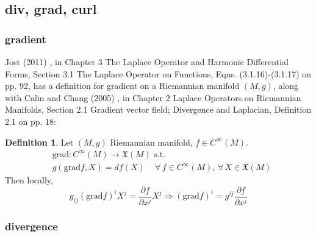 \documentclass[twoside,landscape,10pt]{amsart}
\theoremstyle{plain}
\theoremstyle{definition}
\newtheorem{definition}{Definition}
\theoremstyle{remark}
\theoremstyle{remark}
\begin{document}
\begin{multicols*}{2}

\part{div, grad, curl}

\section{gradient}

Jost (2011) \cite{JJost2011}, in Chapter 3 The Laplace Operator and Harmonic Differential Forms, Section 3.1 The Laplace Operator on Functions, Eqns. (3.1.16)-(3.1.17) on pp. 92, has a definition for gradient on a Riemannian manifold $(M,g)$, along with Calin and Chang (2005) \cite{OCalinDChang2005}, in Chapter 2 Laplace Operators on Riemannian Manifolds, Section 2.1 Gradient vector field; Divergence and Laplacian, Definition 2.1 on pp. 18:
\begin{definition}
  Let $(M,g)$ Riemannian manifold, $f\in C^{\infty}(M)$.  
\begin{equation}
  \begin{aligned}
    &    \text{grad}:C^{\infty}(M) \to \mathfrak{X}(M) \text{ s.t. } \\  
    &  g( \text{grad}f,X) = df(X) \quad \, \forall \, f \in C^{\infty}(M), \, \forall \, X \in \mathfrak{X}(M)
\end{aligned}
\end{equation}
Then locally,
\begin{equation}
g_{ij} (\text{grad}f)^i X^j = \frac{ \partial f}{ \partial x^j} X^j \Longrightarrow (\text{grad}f)^i = g^{ij} \frac{ \partial f}{ \partial x^j}
\end{equation}

\end{definition}

\section{divergence}


\end{multicols*}
\end{document}
